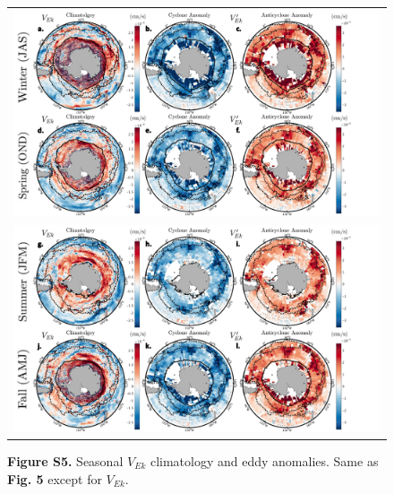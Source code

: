 \documentclass{article}
\begin{document}
\begin{figure}[!htbp]
 \begin{adjustwidth}{-1.2in}{-1.2in}
 \centering
  \begin{tabular}{c }
        \includegraphics[scale=.5]{FigS3a.pdf} \\
        \includegraphics[scale=.5]{FigS3b.pdf} \\
  \end{tabular}
 \end{adjustwidth}
\caption[S5. Seasonal $V_{Ek}$ climatology and eddy anomalies. ]
{\textbf{Figure S5.} Seasonal $V_{Ek}$ climatology and eddy anomalies. Same as \textbf{Fig. 5} except for $V_{Ek}$.
}
\label{fig:FigS3}
\end{figure}







\end{document}
